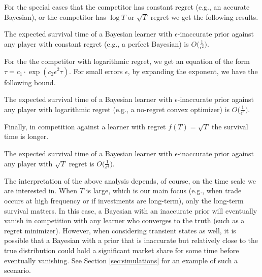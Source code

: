 For the special cases that the competitor has constant regret (e.g., an accurate Bayesian), or the competitor has $\log T$ or $\sqrt{T}$ regret we get the following results. 
\begin{observation}\label{obs:survival-time-gainst-constant-regret}
    The expected survival time of a Bayesian learner with $\epsilon$-inaccurate prior against any player with constant regret (e.g., a perfect Bayesian) is $O\big(\frac{1}{\epsilon^2}\big)$. 
\end{observation}
For the the competitor with logarithmic regret, we get an equation of the form $\tau = c_1 \cdot \exp(c_2 \epsilon^2\tau)$. For small errors $\epsilon$, by expanding the exponent, we have the following bound.
\begin{observation}\label{obs:survival-time-gainst-log-regret}
    The expected survival time of a Bayesian learner with $\epsilon$-inaccurate prior against any player with logarithmic regret (e.g., a no-regret convex optimizer) is $O\big(\frac{1}{\epsilon^3}\big)$.   
\end{observation}
Finally, in competition against a learner with regret $f(T) = \sqrt{T}$ the survival time is longer.
\begin{observation}\label{obs:survival-time-gainst-sqrt-regret}
    The expected survival time of a Bayesian learner with $\epsilon$-inaccurate prior against any player with $\sqrt{T}$ regret is $O\big(\frac{1}{\epsilon^4}\big)$. 
\end{observation}

The interpretation of the above analysis depends, of course, on the time scale we are interested in. When $T$ is large, which is our main focus (e.g., when trade occurs at high frequency or if investments are long-term), only the long-term survival matters. In this case, a Bayesian with an inaccurate prior will eventually vanish in competition with any learner who converges to the truth (such as a regret minimizer). However, when considering transient states as well, it is possible that a Bayesian  with a prior that is inaccurate but relatively close to the true distribution could hold a significant market share for some time before eventually vanishing. See Section \ref{sec:simulations} for an example of such a scenario.

